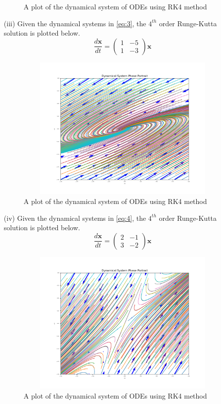 \documentclass[12pt,a4paper]{article}
\begin{document}
\begin{enumerate}
\begin{figure}[!h]
										\caption{A plot of the dynamical system of ODEs using RK4 method}
										\label{fig:q2}
								\end{figure}
					\item[(iii)] Given the dynamical systems in \eqref{eq:3}, the $4^{th}$ order Runge-Kutta solution is plotted below.
				\begin{equation}
						  \frac{d\mathbf{x}}{dt} =  \begin{pmatrix}
		  								1 &  -5\\
		  								1 & -3
		  						\end{pmatrix} \mathbf{x}
						\label{eq:3}
			  \end{equation}
					\begin{figure}[!h]
									\includegraphics[width=430pt,  height=200pt]{./graphics/q001_c.png}
										\caption{A plot of the dynamical system of ODEs using RK4 method}
										\label{fig:q3}
								\end{figure}
								\item[(iv)] Given the dynamical systems in \eqref{eq:4}, the $4^{th}$ order Runge-Kutta solution is plotted below.
				\begin{equation}
						  \frac{d\mathbf{x}}{dt} =  \begin{pmatrix}
		  								2 &  -1\\
		  								 3 &  -2
		  						\end{pmatrix} \mathbf{x}
						\label{eq:4}
			  \end{equation}
					\begin{figure}[!h]
									\includegraphics[width=430pt,  height=200pt]{./graphics/q001_d.png}
										\caption{A plot of the dynamical system of ODEs using RK4 method}
										\label{fig:q4}
								\end{figure}
\end{enumerate}
\end{document}
